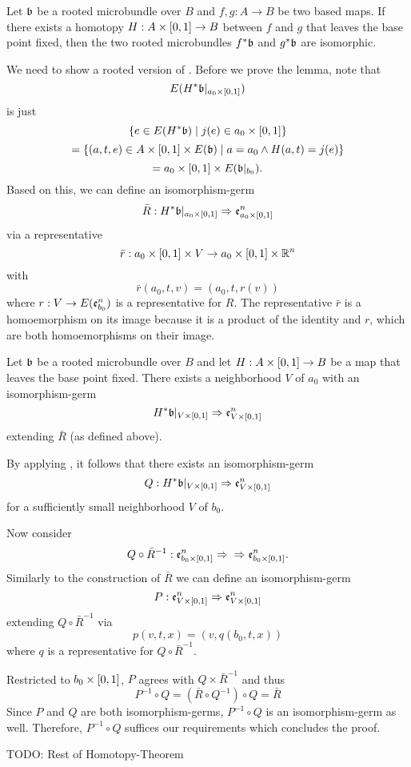 \begin{mytheorem}\label{suspension::homotopy}%
    Let $\mathfrak{b}$ be a rooted microbundle over $B$ and $f, g: A \to B$ be two based maps.
    If there exists a homotopy $H: A \times [0, 1] \to B$ between $f$ and $g$ that leaves the base point fixed,
    then the two rooted microbundles $f^*\mathfrak{b}$ and $g^*\mathfrak{b}$ are isomorphic.
\end{mytheorem}

\begin{myparagraph}
    We need to show a rooted version of .
    Before we prove the lemma, note that 
    \[ E(H^*\mathfrak{b}\vert_{a_0 \times [0, 1]}) \]
    is just
    \[ \{ e \in E(H^*\mathfrak{b}) \mid j(e) \in a_0 \times [0, 1] \} \]
    \[ = \{ (a, t, e) \in A \times [0, 1] \times E(\mathfrak{b}) \mid a = a_0 \land H(a, t) = j(e) \} \]
    \[ = a_0 \times [0, 1] \times E(\mathfrak{b}\vert_{b_0}). \]
    Based on this, we can define an isomorphism-germ
    \[ \bar{R}: H^*\mathfrak{b}\vert_{a_0 \times [0, 1]} \Rightarrow{}{} \mathfrak{e}^{n}_{a_0 \times [0, 1]} \]
    via a representative
    \[ \bar{r}: a_0 \times [0, 1] \times V \to a_0 \times [0, 1] \times \mathbb{R}^n \]
    with
    \[ \bar{r}(a_0, t, v) = (a_0, t, r(v) )\]
    where $r: V \to E(\mathfrak{e}^{n}_{b_0})$ is a representative for $R$.
    The representative $\bar{r}$ is a homoemorphism on its image
    because it is a product of the identity and $r$, which are both homoemorphisms on their image. 
\end{myparagraph}
\begin{mylemma}
    Let $\mathfrak{b}$ be a rooted microbundle over $B$ and let $H: A \times [0, 1] \to B$ be a map that leaves the base point fixed.
    There exists a neighborhood $V$ of $a_0$ with an isomorphism-germ
    \[ H^*\mathfrak{b}\vert_{V \times [0, 1]} \Rightarrow{}{} \mathfrak{e}^{n}_{V \times [0, 1]} \]
    extending $\bar{R}$ (as defined above).
\end{mylemma}
\begin{myproof}
    By applying , it follows that there exists an isomorphism-germ
    \[ Q: H^*\mathfrak{b}\vert_{V \times [0, 1]} \Rightarrow{}{} \mathfrak{e}^{n}_{V \times [0, 1]} \]
    for a sufficiently small neighborhood $V$ of $b_0$.

    Now consider
    \[ Q \circ \bar{R}^{-1}: \mathfrak{e}^{n}_{b_0 \times [0, 1]} \Rightarrow{}{} \Rightarrow{} \mathfrak{e}^{n}_{b_0 \times [0, 1]}. \]
    Similarly to the construction of $\bar{R}$ we can define an isomorphism-germ
    \[ P: \mathfrak{e}^{n}_{V \times [0, 1]} \Rightarrow{}{} \mathfrak{e}^{n}_{V \times [0, 1]} \]
    extending $Q \circ \bar{R}^{-1}$ via
    \[ p(v, t, x) = (v, q(b_0, t, x)) \]
    where $q$ is a representative for $Q \circ \bar{R}^{-1}$.

    Restricted to $b_0 \times [0, 1]$, $P$ agrees with $Q \times \bar{R}^{-1}$ and thus
    \[ P^{-1} \circ Q = (\bar{R} \circ Q^{-1}) \circ Q = \bar{R} \]
    Since $P$ and $Q$ are both isomorphism-germs, $P^{-1} \circ Q$ is an isomorphism-germ as well.
    Therefore, $P^{-1} \circ Q$ suffices our requirements which concludes the proof.
\end{myproof}
TODO: Rest of Homotopy-Theorem